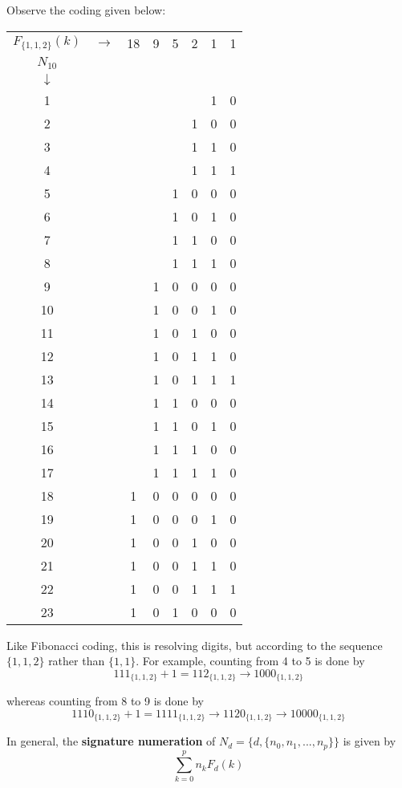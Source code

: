 \documentclass{article}
\begin{document}
\noindent Observe the coding given below:

\begin{center}
\begin{tabular}{c c c c c c c c}
$F_{\{1, 1, 2\}}(k)$ & $\rightarrow$ & 18 & 9 & 5 & 2 & 1 & 1\\
$N_{10}$\\
$\downarrow$\\
1 & & & & & & 1 & 0\\
2 & & & & & 1 & 0 & 0\\
3 & & & & & 1 & 1 & 0\\
4 & & & & & 1 & 1 & 1\\
5 & & & & 1 & 0 & 0 & 0\\
6 & & & & 1 & 0 & 1 & 0\\
7 & & & & 1 & 1 & 0 & 0\\
8 & & & & 1 & 1 & 1 & 0\\
9 & & & 1 & 0 & 0 & 0 & 0\\
10& & & 1 & 0 & 0 & 1 & 0\\
11& & & 1 & 0 & 1 & 0 & 0\\
12& & & 1 & 0 & 1 & 1 & 0\\
13& & & 1 & 0 & 1 & 1 & 1\\
14& & & 1 & 1 & 0 & 0 & 0\\
15& & & 1 & 1 & 0 & 1 & 0\\
16& & & 1 & 1 & 1 & 0 & 0\\
17& & & 1 & 1 & 1 & 1 & 0\\
18& & 1 & 0 & 0 & 0 & 0 & 0\\
19& & 1 & 0 & 0 & 0 & 1 & 0\\
20& & 1 & 0 & 0 & 1 & 0 & 0\\
21& & 1 & 0 & 0 & 1 & 1 & 0\\
22& & 1 & 0 & 0 & 1 & 1 & 1\\
23& & 1 & 0 & 1 & 0 & 0 & 0\\
\end{tabular}
\end{center}

\noindent Like Fibonacci coding, this is resolving digits, but according to the sequence $\{1, 1, 2\}$ rather than $\{1, 1\}$. For example, counting from 4 to 5 is done by $$111_{\{1,1,2\}} + 1 = 112_{\{1,1,2\}} \rightarrow 1000_{\{1,1,2\}}$$

\noindent whereas counting from 8 to 9 is done by $$1110_{\{1,1,2\}} + 1 = 1111_{\{1,1,2\}} \rightarrow 1120_{\{1,1,2\}} \rightarrow 10000_{\{1,1,2\}}$$

\noindent In general, the \textbf{signature numeration} of $N_d = \{d, \{n_0, n_1, ..., n_p\}\}$ is given by \begin{equation}\sum_{k=0}^{p} n_k F_d(k)\end{equation}
\end{document}
